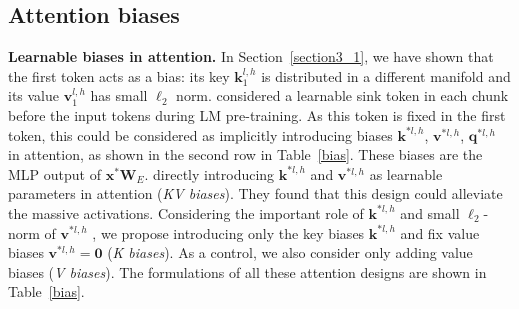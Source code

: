 \documentclass{article} \usepackage{iclr2025_conference,times}
\begin{document}
\vspace{-0.2cm}
\subsection{Attention biases}
\vspace{-0.2cm}
\textbf{Learnable biases in attention.} In Section~\ref{section3_1}, we have shown that the first token acts as a bias: its key $\boldsymbol{k}_1^{l\textrm{,}\,h}$ is distributed in a different manifold and its value $\boldsymbol{v}_1^{l\textrm{,}\,h}$ has small $\ell_2$ norm. \citet{xiao2023efficient} considered a learnable sink token in each chunk before the input tokens during LM pre-training. As this token is fixed in the first token, this could be considered as implicitly introducing biases $\boldsymbol{k}^{*l,h}$, $\boldsymbol{v}^{*l,h}$, $\boldsymbol{q}^{*l,h}$ in attention, as shown in the second row in Table~\ref{bias}. These biases are the MLP output of $\boldsymbol{x}^*\boldsymbol{W}_E$. \citet{sun2024massive} directly introducing $\boldsymbol{k}^{*l,h}$ and $\boldsymbol{v}^{*l,h}$ as learnable parameters in attention (\emph{KV biases}). They found that this design could alleviate the massive activations. Considering the important role of $\boldsymbol{k}^{*l,h}$ and small $\ell_2$-norm of $\boldsymbol{v}^{*l,h}$ , we propose introducing only the key biases  $\boldsymbol{k}^{*l,h}$ and fix value biases $\boldsymbol{v}^{*l,h}=\boldsymbol{0}$ (\emph{K biases}). As a control, we also consider only adding value biases (\emph{V biases}). The formulations of all these attention designs are shown in Table~\ref{bias}.
\end{document}
